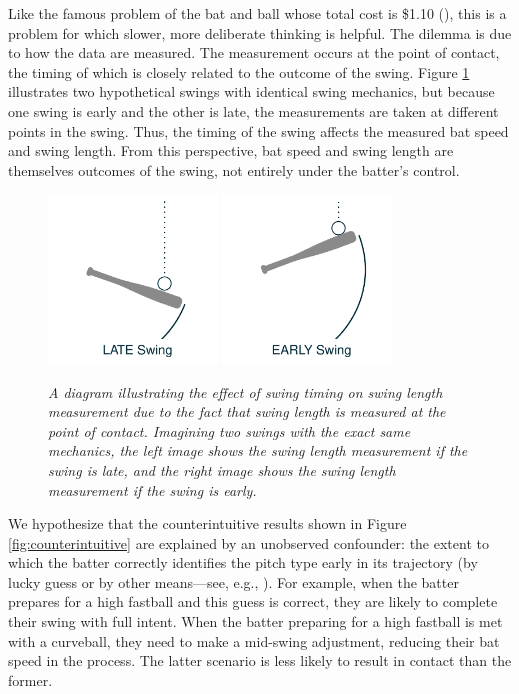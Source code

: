 \documentclass{article}
\begin{document}
    Like the famous problem of the bat and ball whose total cost is \$1.10 (\cite{kahneman_thinking_2011}), this is a problem for which slower, more deliberate thinking is helpful. The dilemma is due to how the data are measured. The measurement occurs at the point of contact, the timing of which is closely related to the outcome of the swing. Figure \ref{fig:swing-diagram} illustrates two hypothetical swings with identical swing mechanics, but because one swing is early and the other is late, the measurements are taken at different points in the swing. Thus, the timing of the swing affects the measured bat speed and swing length. From this perspective, bat speed and swing length are themselves outcomes of the swing, not entirely under the batter's control.

    \begin{figure}
      \centering
      \includegraphics[width = 0.4\textwidth]{figures/swing_late.pdf}
      \includegraphics[width = 0.4\textwidth]{figures/swing_early.pdf}
      \caption{\it A diagram illustrating the effect of swing timing on swing length measurement due to the fact that swing length is measured at the point of contact. Imagining two swings with the exact same mechanics, the left image shows the swing length measurement if the swing is late, and the right image shows the swing length measurement if the swing is early.}
      \label{fig:swing-diagram}
    \end{figure}

    We hypothesize that the counterintuitive results shown in Figure \ref{fig:counterintuitive} are explained by an unobserved confounder: the extent to which the batter correctly identifies the pitch type early in its trajectory (by lucky guess or by other means---see, e.g., \textcite{elmore_bang_2022}). For example, when the batter prepares for a high fastball and this guess is correct, they are likely to complete their swing with full intent. When the batter preparing for a high fastball is met with a curveball, they need to make a mid-swing adjustment, reducing their bat speed in the process. The latter scenario is less likely to result in contact than the former.
\end{document}
